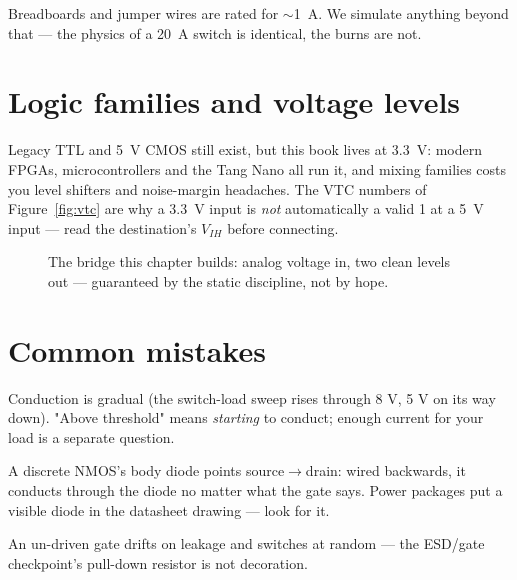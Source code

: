 \begin{rulebox}
Breadboards and jumper wires are rated for $\sim$\qty{1}{\ampere}. We
simulate anything beyond that — the physics of a \qty{20}{\ampere} switch is
identical, the burns are not.
\end{rulebox}

\section{Logic families and voltage levels}
\label{sec:levels}

Legacy TTL and \qty{5}{\volt} CMOS still exist, but this book lives at
\qty{3.3}{\volt}: modern FPGAs, microcontrollers and the Tang Nano all run
it, and mixing families costs you level shifters and
noise-margin headaches. The VTC numbers of Figure~\ref{fig:vtc} are why a
\qty{3.3}{\volt} input is \emph{not} automatically a valid 1 at a
\qty{5}{\volt} input — read the destination's $V_{IH}$ before connecting.

\begin{figure}[htbp]
\centering

\caption{The bridge this chapter builds: analog voltage in, two clean
levels out — guaranteed by the static discipline, not by hope.}
\label{fig:bridge}
\end{figure}

\section{Common mistakes}
\label{sec:transistor-mistakes}

\begin{tripwire}
Conduction is gradual (the switch-load sweep rises through 8 V, 5 V on its
way down). "Above threshold" means \emph{starting} to conduct; enough
current for your load is a separate question.
\end{tripwire}

\begin{tripwire}
A discrete NMOS's body diode points source$\to$drain:
wired backwards, it conducts through the diode no matter what the gate
says. Power packages put a visible diode in the datasheet drawing — look
for it.
\end{tripwire}

\begin{tripwire}
An un-driven gate drifts on leakage and switches at random — the ESD/gate
checkpoint's pull-down resistor is not decoration.
\end{tripwire}

